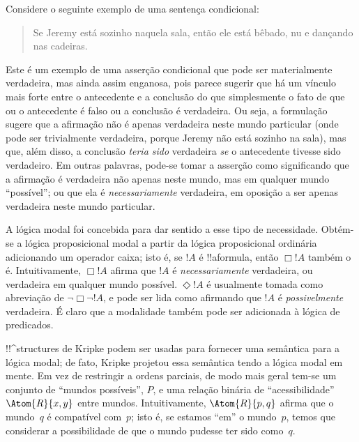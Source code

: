 \documentclass[../../../include/open-logic-section]{subfiles}
\begin{document}


Considere o seguinte exemplo de uma sentença condicional:
\begin{quote}
  Se Jeremy está sozinho naquela sala, então ele está bêbado, nu e
  dançando nas cadeiras.
\end{quote}
Este é um exemplo de uma asserção condicional que pode ser
materialmente verdadeira, mas ainda assim enganosa, pois parece sugerir
que há um vínculo mais forte entre o antecedente e a conclusão do que
simplesmente o fato de que ou o antecedente é falso ou a conclusão é
verdadeira. Ou seja, a formulação sugere que a afirmação não é apenas
verdadeira neste mundo particular (onde pode ser trivialmente verdadeira,
porque Jeremy não está sozinho na sala), mas que, além disso, a conclusão
\emph{teria sido} verdadeira \emph{se} o antecedente tivesse sido
verdadeiro. Em outras palavras, pode-se tomar a asserção como significando
que a afirmação é verdadeira não apenas neste mundo, mas em qualquer mundo
``possível''; ou que ela é \emph{necessariamente} verdadeira, em oposição
a ser apenas verdadeira neste mundo particular.

A lógica modal foi concebida para dar sentido a esse tipo de
necessidade. Obtém-se a lógica proposicional modal a partir da
lógica proposicional ordinária adicionando um operador caixa; isto é,
se $!A$ é !!a{formula}, então $\Box !A$ também o é.  Intuitivamente,
$\Box !A$ afirma que $!A$ é \emph{necessariamente} verdadeira, ou
verdadeira em qualquer mundo possível. $\Diamond !A$ é usualmente
tomada como abreviação de $\lnot \Box \lnot !A$, e pode ser lida como
afirmando que $!A$ é \emph{possivelmente} verdadeira. É claro que a
modalidade também pode ser adicionada à lógica de predicados.

!!^{structure}s de Kripke podem ser usadas para fornecer uma semântica
para a lógica modal; de fato, Kripke projetou essa semântica tendo a
lógica modal em mente. Em vez de restringir a ordens parciais, de modo
mais geral tem-se um conjunto de ``mundos possíveis'', $P$, e uma
relação binária de ``acessibilidade'' $\Atom{R}{x,y}$ entre mundos.
Intuitivamente, $\Atom{R}{p,q}$ afirma que o mundo~$q$ é compatível
com~$p$; isto é, se estamos ``em'' o mundo~$p$, temos que considerar a
possibilidade de que o mundo pudesse ter sido como~$q$.
\end{document}
